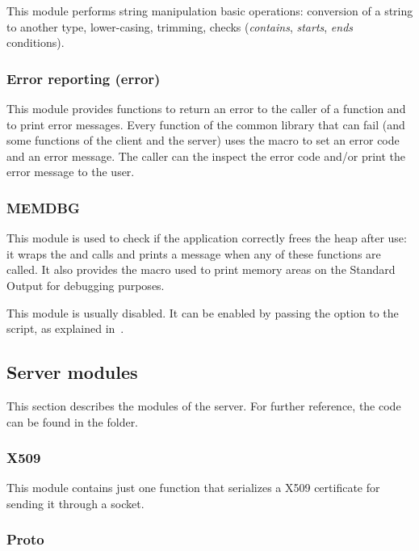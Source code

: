This module performs string manipulation basic operations: conversion of a
string to another type, lower-casing, trimming, checks (\emph{contains},
\emph{starts}, \emph{ends} conditions).

\subsubsection{Error reporting (error)}

This module provides functions to return an error to the caller of a function
and to print error messages. Every function of the common library that can fail
(and some functions of the client and the server) uses the 
macro to set an error code and an error message. The caller can the inspect the
error code and/or print the error message to the user.

\subsubsection{MEMDBG}

This module is used to check if the application correctly frees the heap after
use: it wraps the  and  calls and prints a message when
any of these functions are called. It also provides the 
macro used to print memory areas on the Standard Output for debugging purposes.

This module is usually disabled. It can be enabled by passing the
 option to the  script, as explained
in~.


\subsection{Server modules}\label{subsec:servermod}

This section describes the modules of the server. For further reference, the
code can be found in the  folder.

\subsubsection{X509}

This module contains just one function that serializes a X509 certificate for
sending it through a socket.

\subsubsection{Proto}

